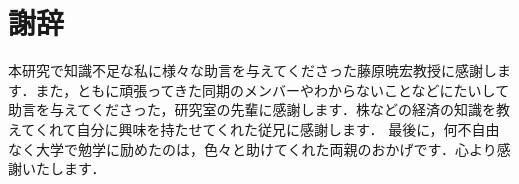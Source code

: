 \chapter*{謝辞}


\indent
本研究で知識不足な私に様々な助言を与えてくださった藤原暁宏教授に感謝します．また，ともに頑張ってきた同期のメンバーやわからないことなどにたいして
助言を与えてくださった，研究室の先輩に感謝します．株などの経済の知識を教えてくれて自分に興味を持たせてくれた従兄に感謝します．
最後に，何不自由なく大学で勉学に励めたのは，色々と助けてくれた両親のおかげです．心より感謝いたします．
